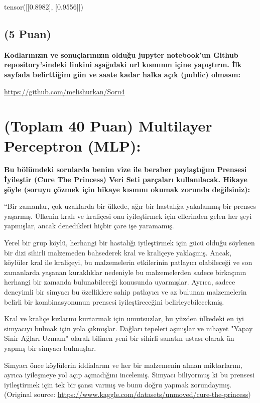 \documentclass[11pt]{article}
\begin{document}
tensor([[0.8982],
        [0.9556]])

\subsection{(5 Puan)} \textbf{Kodlarınızın ve sonuçlarınızın olduğu jupyter notebook'un Github repository'sindeki linkini aşağıdaki url kısmının içine yapıştırın. İlk sayfada belirttiğim gün ve saate kadar halka açık (public) olmasın:}

\url{https://github.com/melishurkan/Soru4}

\section{(Toplam 40 Puan) Multilayer Perceptron (MLP):} 
\textbf{Bu bölümdeki sorularda benim vize ile beraber paylaştığım Prensesi İyileştir (Cure The Princess) Veri Seti parçaları kullanılacak. Hikaye şöyle (soruyu çözmek için hikaye kısmını okumak zorunda değilsiniz):} 

``Bir zamanlar, çok uzaklarda bir ülkede, ağır bir hastalığa yakalanmış bir prenses yaşarmış. Ülkenin kralı ve kraliçesi onu iyileştirmek için ellerinden gelen her şeyi yapmışlar, ancak denedikleri hiçbir çare işe yaramamış.

Yerel bir grup köylü, herhangi bir hastalığı iyileştirmek için gücü olduğu söylenen bir dizi sihirli malzemeden bahsederek kral ve kraliçeye yaklaşmış. Ancak, köylüler kral ile kraliçeyi, bu malzemelerin etkilerinin patlayıcı olabileceği ve son zamanlarda yaşanan kuraklıklar nedeniyle bu malzemelerden sadece birkaçının herhangi bir zamanda bulunabileceği konusunda uyarmışlar. Ayrıca, sadece deneyimli bir simyacı bu özelliklere sahip patlayıcı ve az bulunan malzemelerin belirli bir kombinasyonunun prensesi iyileştireceğini belirleyebilecekmiş.

Kral ve kraliçe kızlarını kurtarmak için umutsuzlar, bu yüzden ülkedeki en iyi simyacıyı bulmak için yola çıkmışlar. Dağları tepeleri aşmışlar ve nihayet "Yapay Sinir Ağları Uzmanı" olarak bilinen yeni bir sihirli sanatın ustası olarak ün yapmış bir simyacı bulmuşlar.

Simyacı önce köylülerin iddialarını ve her bir malzemenin alınan miktarlarını, ayrıca iyileşmeye yol açıp açmadığını incelemiş. Simyacı biliyormuş ki bu prensesi iyileştirmek için tek bir şansı varmış ve bunu doğru yapmak zorundaymış. (Original source: \url{https://www.kaggle.com/datasets/unmoved/cure-the-princess})
\end{document}
